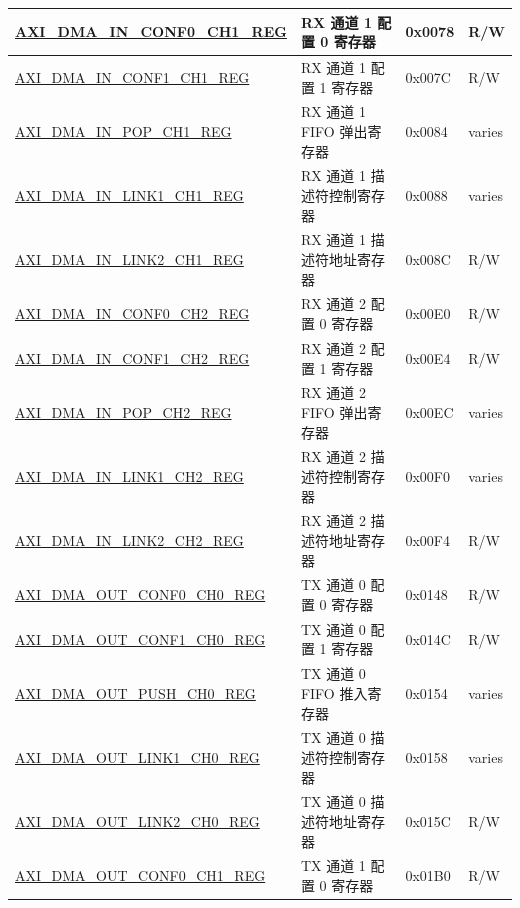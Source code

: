 \begin{longtable}{ | l | l | p{1.3cm} | l | }
\hyperref[regdesc:AXIDMAINCONF0CHNREG]{AXI\_DMA\_IN\_CONF0\_CH1\_REG} & RX 通道 1 配置 0 寄存器 & 0x0078 & R/W \\ \hline
\hyperref[regdesc:AXIDMAINCONF1CHNREG]{AXI\_DMA\_IN\_CONF1\_CH1\_REG} & RX 通道 1 配置 1 寄存器 & 0x007C & R/W \\ \hline
\hyperref[regdesc:AXIDMAINPOPCHNREG]{AXI\_DMA\_IN\_POP\_CH1\_REG} & RX 通道 1 FIFO 弹出寄存器 & 0x0084 & varies \\ \hline
\hyperref[regdesc:AXIDMAINLINK1CHNREG]{AXI\_DMA\_IN\_LINK1\_CH1\_REG} & RX 通道 1 描述符控制寄存器 & 0x0088 & varies \\ \hline
\hyperref[regdesc:AXIDMAINLINK2CHNREG]{AXI\_DMA\_IN\_LINK2\_CH1\_REG} & RX 通道 1 描述符地址寄存器 & 0x008C & R/W \\ \hline
\hyperref[regdesc:AXIDMAINCONF0CHNREG]{AXI\_DMA\_IN\_CONF0\_CH2\_REG} & RX 通道 2 配置 0 寄存器 & 0x00E0 & R/W \\ \hline
\hyperref[regdesc:AXIDMAINCONF1CHNREG]{AXI\_DMA\_IN\_CONF1\_CH2\_REG} & RX 通道 2 配置 1 寄存器 & 0x00E4 & R/W \\ \hline
\hyperref[regdesc:AXIDMAINPOPCHNREG]{AXI\_DMA\_IN\_POP\_CH2\_REG} & RX 通道 2 FIFO 弹出寄存器 & 0x00EC & varies \\ \hline
\hyperref[regdesc:AXIDMAINLINK1CHNREG]{AXI\_DMA\_IN\_LINK1\_CH2\_REG} & RX 通道 2 描述符控制寄存器 & 0x00F0 & varies \\ \hline
\hyperref[regdesc:AXIDMAINLINK2CHNREG]{AXI\_DMA\_IN\_LINK2\_CH2\_REG} & RX 通道 2 描述符地址寄存器 & 0x00F4 & R/W \\ \hline
\hyperref[regdesc:AXIDMAOUTCONF0CHNREG]{AXI\_DMA\_OUT\_CONF0\_CH0\_REG} & TX 通道 0 配置 0 寄存器 & 0x0148 & R/W \\ \hline
\hyperref[regdesc:AXIDMAOUTCONF1CHNREG]{AXI\_DMA\_OUT\_CONF1\_CH0\_REG} & TX 通道 0 配置 1 寄存器 & 0x014C & R/W \\ \hline
\hyperref[regdesc:AXIDMAOUTPUSHCHNREG]{AXI\_DMA\_OUT\_PUSH\_CH0\_REG} & TX 通道 0 FIFO 推入寄存器 & 0x0154 & varies \\ \hline
\hyperref[regdesc:AXIDMAOUTLINK1CHNREG]{AXI\_DMA\_OUT\_LINK1\_CH0\_REG} & TX 通道 0 描述符控制寄存器 & 0x0158 & varies \\ \hline
\hyperref[regdesc:AXIDMAOUTLINK2CHNREG]{AXI\_DMA\_OUT\_LINK2\_CH0\_REG} & TX 通道 0 描述符地址寄存器 & 0x015C & R/W \\ \hline
\hyperref[regdesc:AXIDMAOUTCONF0CHNREG]{AXI\_DMA\_OUT\_CONF0\_CH1\_REG} & TX 通道 1 配置 0 寄存器 & 0x01B0 & R/W \\ \hline

\end{longtable}
